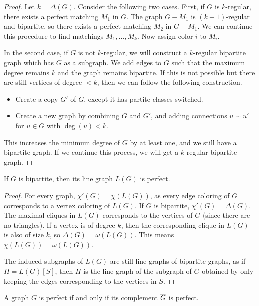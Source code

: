 \begin{proof}
  Let $k = \Delta(G)$.
  Consider the following two cases.
  First, if $G$ is $k$-regular, there exists a perfect matching $M_1$ in $G$.
  The graph $G - M_1$ is $(k-1)$-regular and bipartite, so there exists a perfect
  matching $M_2$ in $G - M_1$.
  We can continue this procedure to find matchings $M_1, \ldots, M_k$.
  Now assign color $i$ to $M_i$.

  In the second case, if $G$ is not $k$-regular, we will construct a $k$-regular
  bipartite graph which has $G$ as a subgraph.
  We add edges to $G$ such that the maximum degree remains $k$ and the graph
  remains bipartite.
  If this is not possible but there are still vertices of degree $< k$, then we
  can follow the following construction.
  \begin{itemize}
  \item Create a copy $G'$ of $G$, except it has partite classes switched.
  \item Create a new graph by combining $G$ and $G'$, and adding connections $u
	\sim u'$ for $u \in G$ with $\deg(u) < k$.
  \end{itemize}
  This increases the minimum degree of $G$ by at least one, and we still have a
  bipartite graph.
  If we continue this process, we will get a $k$-regular bipartite graph.
\end{proof}

\begin{theorem}
  If $G$ is bipartite, then its line graph $L(G)$ is perfect.
\end{theorem}

\begin{proof}
  For every graph, $\chi'(G) = \chi(L(G))$, as every edge coloring of $G$
  corresponds to a vertex coloring of $L(G)$.
  If $G$ is bipartite, $\chi'(G) = \Delta(G)$.
  The maximal cliques in $L(G)$ corresponds to the vertices of $G$ (since there
  are no triangles).
  If a vertex is of degree $k$, then the corresponding clique in $L(G)$ is also
  of size $k$, so $\Delta(G) = \omega(L(G))$.
  This means $\chi(L(G)) = \omega(L(G))$.

  The induced subgraphs of $L(G)$ are still line graphs of bipartite graphs, as
  if $H = L(G)[S]$, then $H$ is the line graph of the subgraph of $G$ obtained
  by only keeping the edges corresponding to the vertices in $S$.
\end{proof}

\begin{theorem}
  A graph $G$ is perfect if and only if its complement $\overline{G}$ is perfect.
\end{theorem}


